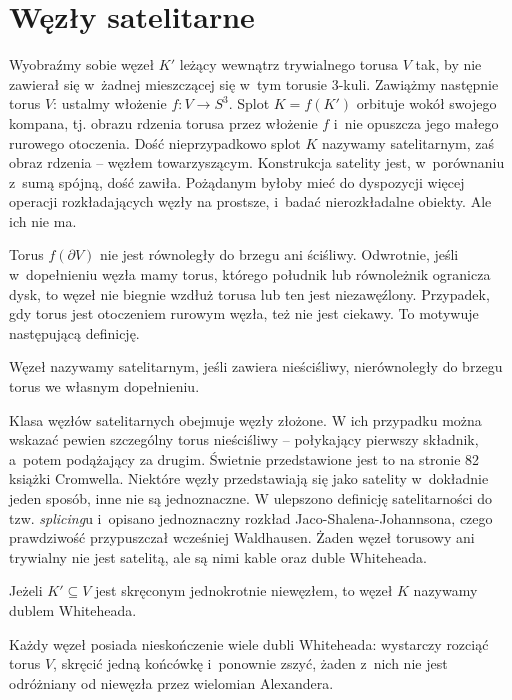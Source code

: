 \section{Węzły satelitarne} %
\label{sec:satellite}
Wyobraźmy sobie węzeł $K'$ leżący wewnątrz trywialnego torusa $V$ tak, by nie zawierał się w~żadnej mieszczącej się w~tym torusie 3-kuli.
Zawiążmy następnie torus $V$: ustalmy włożenie $f \colon V \to S^3$.
Splot $K = f(K')$ orbituje wokół swojego kompana, tj. obrazu rdzenia torusa przez włożenie $f$ i~nie opuszcza jego małego rurowego otoczenia.
Dość nieprzypadkowo splot $K$ nazywamy satelitarnym, zaś obraz rdzenia -- węzłem towarzyszącym.
Konstrukcja satelity jest, w~porównaniu z~sumą spójną, dość zawiła.
Pożądanym byłoby mieć do dyspozycji więcej operacji rozkładających węzły na prostsze, i~badać nierozkładalne obiekty.
Ale ich nie ma.

Torus $f(\partial V)$ nie jest równoległy do brzegu ani ściśliwy.
Odwrotnie, jeśli w~dopełnieniu węzła mamy torus, którego południk lub równoleżnik ogranicza dysk, to węzeł nie biegnie wzdłuż torusa lub ten jest niezawęźlony.
Przypadek, gdy torus jest otoczeniem rurowym węzła, też nie jest ciekawy.
To motywuje następującą definicję.

\begin{definition}
    Węzeł nazywamy satelitarnym, jeśli zawiera nieściśliwy, nierównoległy do brzegu torus we własnym dopełnieniu.
\end{definition}

Klasa węzłów satelitarnych obejmuje węzły złożone.
W ich przypadku można wskazać pewien szczególny torus nieściśliwy -- połykający pierwszy składnik, a~potem podążający za drugim.
Świetnie przedstawione jest to na stronie 82 książki \cite{cromwell04} Cromwella.
Niektóre węzły przedstawiają się jako satelity w~dokładnie jeden sposób, inne nie są jednoznaczne.
W \cite{jaco79} ulepszono definicję satelitarności do tzw. \emph{splicing}u i~opisano jednoznaczny rozkład Jaco-Shalena-Johannsona, czego prawdziwość przypuszczał wcześniej Waldhausen.
Żaden węzeł torusowy ani trywialny nie jest satelitą, ale są nimi kable oraz duble Whiteheada.

\begin{definition}
    Jeżeli $K' \subseteq V$ jest skręconym jednokrotnie niewęzłem, to węzeł $K$ nazywamy dublem Whiteheada.
\end{definition}

Każdy węzeł posiada nieskończenie wiele dubli Whiteheada: wystarczy rozciąć torus $V$, skręcić jedną końcówkę i~ponownie zszyć, żaden z~nich nie jest odróżniany od niewęzła przez wielomian Alexandera.


